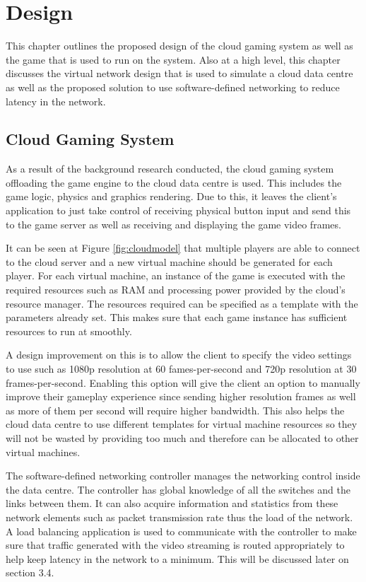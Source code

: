 \chapter{Design}
\label{chapter3}
This chapter outlines the proposed design of the cloud gaming system as well as the game that is used to run on the system. Also at a high level, this chapter discusses the virtual network design that is used to simulate a cloud data centre as well as the proposed solution to use software-defined networking to reduce latency in the network.

\section{Cloud Gaming System}
As a result of the background research conducted, the cloud gaming system offloading the game engine to the cloud data centre is used. This includes the game logic, physics and graphics rendering. Due to this, it leaves the client's application to just take control of receiving physical button input and send this to the game server as well as receiving and displaying the game video frames.
\newline
\par
It can be seen at Figure \ref{fig:cloudmodel} that multiple players are able to connect to the cloud server and a new virtual machine should be generated for each player. For each virtual machine, an instance of the game is executed with the required resources such as RAM and processing power provided by the cloud's resource manager. The resources required can be specified as a template with the parameters already set. This makes sure that each game instance has sufficient resources to run at smoothly.
\newline
\par
A design improvement on this is to allow the client to specify the video settings to use such as 1080p resolution at 60 fames-per-second and 720p resolution at 30 frames-per-second. Enabling this option will give the client an option to manually improve their gameplay experience since sending higher resolution frames as well as more of them per second will require higher bandwidth. This also helps the cloud data centre to use different templates for virtual machine resources so they will not be wasted by providing too much and therefore can be allocated to other virtual machines.
\newline
\par
The software-defined networking controller manages the networking control inside the data centre. The controller has global knowledge of all the switches and the links between them. It can also acquire information and statistics from these network elements such as packet transmission rate thus the load of the network. A load balancing application is used to communicate with the controller to make sure that traffic generated with the video streaming is routed appropriately to help keep latency in the network to a minimum. This will be discussed later on section 3.4.
